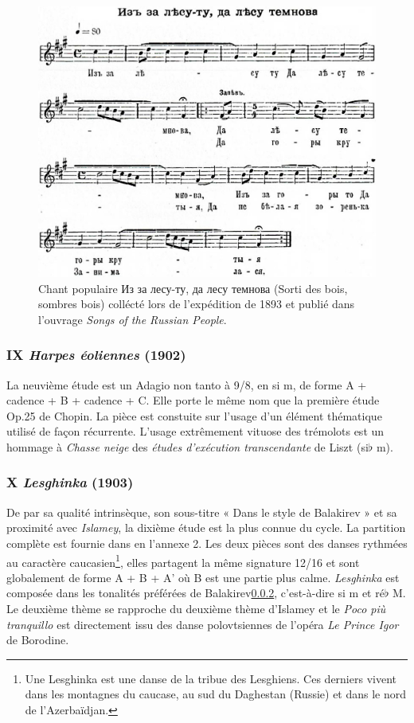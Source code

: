 \begin{figure}[!ht]
  \begin{bigcenter}
    \includegraphics[width=15.0cm, keepaspectratio]{woods.png}
  \end{bigcenter}
  \caption{\label{woods}Chant populaire \foreignlanguage{russian}{Из за лесу-ту, да лесу темнова} (Sorti des bois, sombres bois) collécté lors de l'expédition de 1893 et publié dans l'ouvrage \emph{Songs of the Russian People}.}
\end{figure}

\subsubsection{IX \emph{Harpes éoliennes} (1902)}

La neuvième étude est un Adagio non tanto à 9/8, en si m, de forme A + cadence + B + cadence + C. Elle porte le même nom que la première étude Op.25 de Chopin. La pièce est constuite sur l'usage d'un élément thématique utilisé de façon récurrente. L'usage extrêmement vituose des trémolots est un hommage à \emph{Chasse neige} des \emph{études d'exécution transcendante} de Liszt (si$\flat$ m).

\subsubsection{X \emph{Lesghinka} (1903)}

De par sa qualité intrinsèque, son sous-titre « Dans le style de Balakirev » et sa proximité avec \emph{Islamey}, la dixième étude est la plus connue du cycle. La partition complète est fournie dans en l'annexe 2. Les deux pièces sont des danses rythmées au caractère caucasien\footnote{Une Lesghinka est une danse de la tribue des Lesghiens. Ces derniers vivent dans les montagnes du caucase, au sud du Daghestan (Russie) et dans le nord de l'Azerbaïdjan.}, elles partagent la même signature 12/16 et sont globalement de forme A + B + A' où B est une partie plus calme. \emph{Lesghinka} est composée dans les tonalités préférées de Balakirev\ref{}, c'est-à-dire si m et ré$\flat$ M. Le deuxième thème se rapproche du deuxième thème d'Islamey et le \emph{Poco pi\`{u} tranquillo} est directement issu des danse polovtsiennes de l'opéra \emph{Le Prince Igor} de Borodine.


